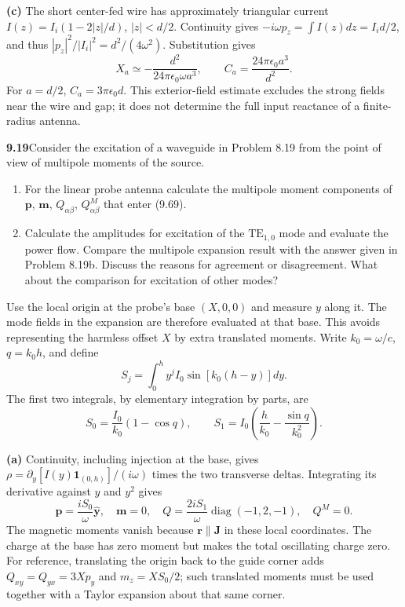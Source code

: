 \textbf{(c)} The short center-fed wire has approximately triangular
current $I(z)=I_i(1-2|z|/d)$, $|z|<d/2$. Continuity gives
$-i\omega p_z=\int I(z)dz=I_id/2$, and thus
$|p_z|^2/|I_i|^2=d^2/(4\omega^2)$. Substitution gives
\[
\boxed{X_a\simeq-\frac{d^2}{24\pi\epsilon_0\omega a^3},\qquad
C_a=\frac{24\pi\epsilon_0a^3}{d^2}.}
\]
For $a=d/2$, $C_a=3\pi\epsilon_0d$. This exterior-field estimate excludes
the strong fields near the wire and gap; it does not determine the full
input reactance of a finite-radius antenna.

\par\bigskip
\noindent\textbf{9.19}\quad Consider the excitation of a waveguide in Problem 8.19 from the point of view of multipole moments of the source.
\begin{enumerate}
\item[(a)] For the linear probe antenna calculate the multipole moment components of $\mathbf{p}$, $\mathbf{m}$, $Q_{\alpha\beta}$, $Q^{M}_{\alpha\beta}$ that enter (9.69).
\item[(b)] Calculate the amplitudes for excitation of the $\mathrm{TE}_{1,0}$ mode and evaluate the power flow. Compare the multipole expansion result with the answer given in Problem 8.19b. Discuss the reasons for agreement or disagreement. What about the comparison for excitation of other modes?
\end{enumerate}
\solution

Use the local origin at the probe's base $(X,0,0)$ and measure $y$ along
it. The mode fields in the expansion are therefore evaluated at that
base. This avoids representing the harmless offset $X$ by extra
translated moments. Write $k_0=\omega/c$, $q=k_0h$, and define
\[
S_j=\int_0^h y^j I_0\sin[k_0(h-y)]dy.
\]
The first two integrals, by elementary integration by parts, are
\[
S_0=\frac{I_0}{k_0}(1-\cos q),\qquad
S_1=I_0\left(\frac h{k_0}-\frac{\sin q}{k_0^2}\right).
\]

\textbf{(a)} Continuity, including injection at the base, gives
$\rho=\partial_y[I(y)\mathbf1_{(0,h)}]/(i\omega)$ times the two
transverse deltas. Integrating its derivative against $y$ and $y^2$
gives
\[
\boxed{\mathbf p=\frac{iS_0}{\omega}\hat{\mathbf y},\quad
\mathbf m=0,\quad
Q=\frac{2iS_1}{\omega}\operatorname{diag}(-1,2,-1),\quad Q^M=0.}
\]
The magnetic moments vanish because $\mathbf r\parallel\mathbf J$ in
these local coordinates. The charge at the base has zero moment but
makes the total oscillating charge zero. For reference, translating the
origin back to the guide corner adds $Q_{xy}=Q_{yx}=3Xp_y$ and
$m_z=XS_0/2$; such translated moments must be used together with a
Taylor expansion about that same corner.

